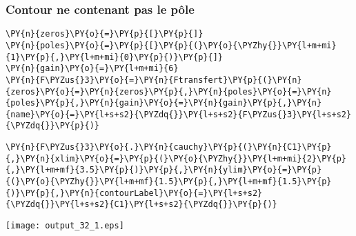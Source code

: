 \subsubsection{Contour ne contenant pas le pôle}
\begin{tcolorbox}[breakable, size=fbox, boxrule=1pt, pad at break*=1mm,colback=cellbackground, colframe=cellborder]
\begin{Verbatim}[commandchars=\\\{\}]
\PY{n}{zeros}\PY{o}{=}\PY{p}{[}\PY{p}{]}
\PY{n}{poles}\PY{o}{=}\PY{p}{[}\PY{p}{(}\PY{o}{\PYZhy{}}\PY{l+m+mi}{1}\PY{p}{,}\PY{l+m+mi}{0}\PY{p}{)}\PY{p}{]}
\PY{n}{gain}\PY{o}{=}\PY{l+m+mi}{6}
\PY{n}{F\PYZus{}3}\PY{o}{=}\PY{n}{Ftransfert}\PY{p}{(}\PY{n}{zeros}\PY{o}{=}\PY{n}{zeros}\PY{p}{,}\PY{n}{poles}\PY{o}{=}\PY{n}{poles}\PY{p}{,}\PY{n}{gain}\PY{o}{=}\PY{n}{gain}\PY{p}{,}\PY{n}{name}\PY{o}{=}\PY{l+s+s2}{\PYZdq{}}\PY{l+s+s2}{F\PYZus{}3}\PY{l+s+s2}{\PYZdq{}}\PY{p}{)}
\end{Verbatim}
\end{tcolorbox}
\begin{tcolorbox}[breakable, size=fbox, boxrule=1pt, pad at break*=1mm,colback=cellbackground, colframe=cellborder]
\begin{Verbatim}[commandchars=\\\{\}]
\PY{n}{F\PYZus{}3}\PY{o}{.}\PY{n}{cauchy}\PY{p}{(}\PY{n}{C1}\PY{p}{,}\PY{n}{xlim}\PY{o}{=}\PY{p}{(}\PY{o}{\PYZhy{}}\PY{l+m+mi}{2}\PY{p}{,}\PY{l+m+mf}{3.5}\PY{p}{)}\PY{p}{,}\PY{n}{ylim}\PY{o}{=}\PY{p}{(}\PY{o}{\PYZhy{}}\PY{l+m+mf}{1.5}\PY{p}{,}\PY{l+m+mf}{1.5}\PY{p}{)}\PY{p}{,}\PY{n}{contourLabel}\PY{o}{=}\PY{l+s+s2}{\PYZdq{}}\PY{l+s+s2}{C1}\PY{l+s+s2}{\PYZdq{}}\PY{p}{)}
\end{Verbatim}
\end{tcolorbox}
\begin{center}
    \texttt{[image: output\_32\_1.eps]}
\end{center}
